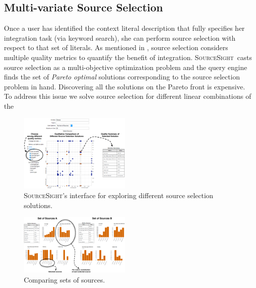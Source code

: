 \documentclass{vldb}
\newcommand\system{\textsc{SourceSight}}
\begin{document}
\subsection{Multi-variate Source Selection}
\label{sec:sourcesel}
Once a user has identified the context literal description that fully specifies her integration task (via keyword search), she can perform source selection with respect to that set of literals. As mentioned in , source selection considers multiple quality metrics to quantify the benefit of integration. \system~casts source selection as a multi-objective optimization problem and the query engine finds the set of {\em Pareto optimal} solutions corresponding to the source selection problem in hand. Discovering all the solutions on the Pareto front is expensive. To address this issue we solve source selection for different linear combinations of the 

\begin{figure}
	\begin{center}
	\includegraphics[trim=0 0 0 85, clip,width=0.48\textwidth]{fig/ssResults}
	\caption{\system's interface for exploring different source selection solutions.}
	\label{fig:ssresults}
	\end{center}
\end{figure}

\begin{figure}
	\begin{center}
	\includegraphics[trim=0 0 0 0, clip,width=0.48\textwidth]{fig/compSS}
	\caption{Comparing sets of sources.}
	\label{fig:comparison}
	\end{center}
\end{figure}
\end{document}
